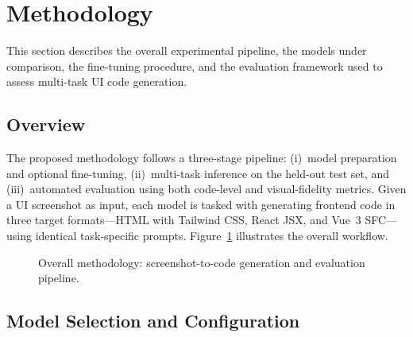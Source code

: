 
\section{Methodology}

This section describes the overall experimental pipeline, the models under comparison, the fine-tuning procedure, and the evaluation framework used to assess multi-task UI code generation.

\subsection{Overview}

The proposed methodology follows a three-stage pipeline: (i)~model preparation and optional fine-tuning, (ii)~multi-task inference on the held-out test set, and (iii)~automated evaluation using both code-level and visual-fidelity metrics. Given a UI screenshot as input, each model is tasked with generating frontend code in three target formats—HTML with Tailwind CSS, React JSX, and Vue~3 SFC—using identical task-specific prompts. Figure~\ref{fig:methodology} illustrates the overall workflow.

\begin{figure}[h]
\centering
\caption{Overall methodology: screenshot-to-code generation and evaluation pipeline.}
\label{fig:methodology}
\end{figure}

\subsection{Model Selection and Configuration}

